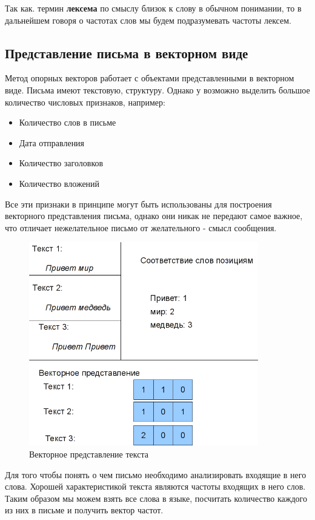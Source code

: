 Так как. термин \textbf{лексема} по смыслу близок к слову в обычном понимании, то в дальнейшем говоря о частотах слов мы будем подразумевать частоты лексем.

\subsection{Представление письма в векторном виде}
\label{MESSAGEVECTOR}
Метод опорных векторов работает с объектами представленными в векторном виде.
Письма имеют текстовую, структуру. Однако у возможно выделить большое количество
числовых признаков, например:
\begin{itemize}
    \item Количество слов в письме
    \item Дата отправления
    \item Количество заголовков
    \item Количество вложений
\end{itemize}
Все эти признаки в принципе могут быть использованы для построения векторного
представления письма, однако они никак не передают самое важное, что отличает
нежелательное письмо от желательного - смысл сообщения.

\begin{figure}[h]
\begin{center}
\includegraphics[width=10cm]{img/vectorize}
\end{center}
\caption{Векторное представление текста}
\label{svm-kernel}
\end{figure}

Для того чтобы понять о чем письмо необходимо анализировать входящие в него слова.
Хорошей характеристикой текста являются частоты входящих в него слов.
Таким образом мы можем взять все слова в языке, посчитать количество каждого из них в письме
и получить вектор частот.

